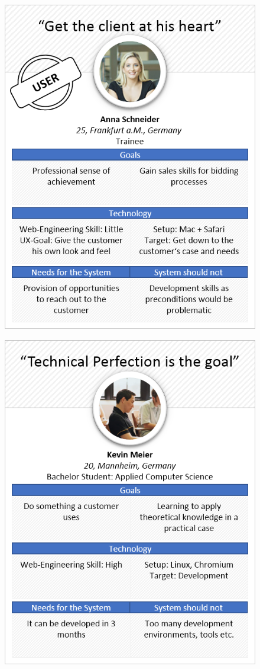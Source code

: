 \begin{figure}[H] 
        \centering\includegraphics[width=\textwidth]{img/diagrams/personas/owner2.png}
	\captionsetup{labelformat=empty}
        \caption[]{}
\end{figure}

\begin{figure}[H] 
        \centering\includegraphics[width=\textwidth]{img/diagrams/personas/developer.png}
	\captionsetup{labelformat=empty}
        \caption[]{}
\end{figure}